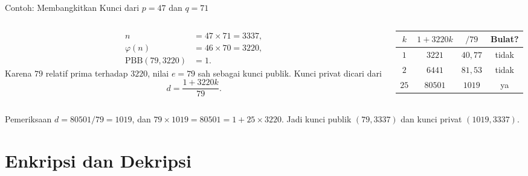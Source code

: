 \documentclass[aspectratio=169,11pt]{beamer}
\begin{document}
\begin{frame}{Contoh: Membangkitkan Kunci dari $p=47$ dan $q=71$}
    \footnotesize
    \begin{columns}[T,onlytextwidth]
        \begin{column}{0.52\textwidth}
            \begin{align*}
                n &= 47 \times 71 = 3337, \\
                \varphi(n) &= 46 \times 70 = 3220, \\
                \text{PBB}(79,3220) &= 1.
            \end{align*}
            Karena $79$ relatif prima terhadap $3220$, nilai $e = 79$ sah
            sebagai kunci publik. Kunci privat dicari dari
            \[
                d = \frac{1 + 3220k}{79}.
            \]
        \end{column}
        \begin{column}{0.46\textwidth}
            \begin{tabular}{@{}c c c c@{}}
                \toprule
                $k$ & $1+3220k$ & $/79$ & Bulat? \\
                \midrule
                $1$  & $3221$  & $40{,}77$ & tidak \\
                $2$  & $6441$  & $81{,}53$ & tidak \\
                $25$ & $80501$ & $1019$    & ya \\
                \bottomrule
            \end{tabular}
        \end{column}
    \end{columns}
    \vspace{0.1cm}
    \begin{exampleblock}{Pemeriksaan}
        \footnotesize
        $d = 80501/79 = 1019$, dan $79 \times 1019 = 80501 = 1 + 25 \times
        3220$. Jadi kunci publik $(79,3337)$ dan kunci privat $(1019,3337)$.
    \end{exampleblock}
\end{frame}

\section{Enkripsi dan Dekripsi}
\end{document}
